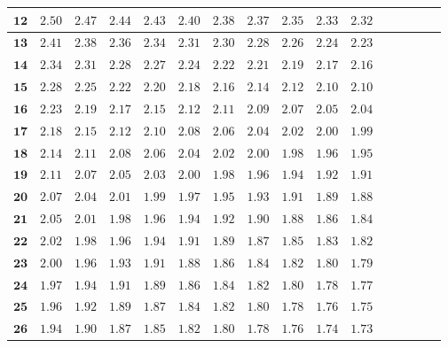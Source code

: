 \begin{alternateColorTable}
\begin{longtable}{|r|r|r|r|r|r|r|r|r|r|r|r|r|r|r|r|}
    \(\mathbf{12}\)& \(2.50\) & \(2.47\) & \(2.44\) & \(2.43\) & \(2.40\) & \(2.38\) & \(2.37\) & \(2.35\) & \(2.33\) & \(2.32\) \\ \hline 
    \(\mathbf{13}\)& \(2.41\) & \(2.38\) & \(2.36\) & \(2.34\) & \(2.31\) & \(2.30\) & \(2.28\) & \(2.26\) & \(2.24\) & \(2.23\) \\ \hline 
    \(\mathbf{14}\)& \(2.34\) & \(2.31\) & \(2.28\) & \(2.27\) & \(2.24\) & \(2.22\) & \(2.21\) & \(2.19\) & \(2.17\) & \(2.16\) \\ \hline 
    \(\mathbf{15}\)& \(2.28\) & \(2.25\) & \(2.22\) & \(2.20\) & \(2.18\) & \(2.16\) & \(2.14\) & \(2.12\) & \(2.10\) & \(2.10\) \\ \hline 
    \(\mathbf{16}\)& \(2.23\) & \(2.19\) & \(2.17\) & \(2.15\) & \(2.12\) & \(2.11\) & \(2.09\) & \(2.07\) & \(2.05\) & \(2.04\) \\ \hline 
    \(\mathbf{17}\)& \(2.18\) & \(2.15\) & \(2.12\) & \(2.10\) & \(2.08\) & \(2.06\) & \(2.04\) & \(2.02\) & \(2.00\) & \(1.99\) \\ \hline 
    \(\mathbf{18}\)& \(2.14\) & \(2.11\) & \(2.08\) & \(2.06\) & \(2.04\) & \(2.02\) & \(2.00\) & \(1.98\) & \(1.96\) & \(1.95\) \\ \hline 
    \(\mathbf{19}\)& \(2.11\) & \(2.07\) & \(2.05\) & \(2.03\) & \(2.00\) & \(1.98\) & \(1.96\) & \(1.94\) & \(1.92\) & \(1.91\) \\ \hline 
    \(\mathbf{20}\)& \(2.07\) & \(2.04\) & \(2.01\) & \(1.99\) & \(1.97\) & \(1.95\) & \(1.93\) & \(1.91\) & \(1.89\) & \(1.88\) \\ \hline 
    \(\mathbf{21}\)& \(2.05\) & \(2.01\) & \(1.98\) & \(1.96\) & \(1.94\) & \(1.92\) & \(1.90\) & \(1.88\) & \(1.86\) & \(1.84\) \\ \hline 
    \(\mathbf{22}\)& \(2.02\) & \(1.98\) & \(1.96\) & \(1.94\) & \(1.91\) & \(1.89\) & \(1.87\) & \(1.85\) & \(1.83\) & \(1.82\) \\ \hline 
    \(\mathbf{23}\)& \(2.00\) & \(1.96\) & \(1.93\) & \(1.91\) & \(1.88\) & \(1.86\) & \(1.84\) & \(1.82\) & \(1.80\) & \(1.79\) \\ \hline 
    \(\mathbf{24}\)& \(1.97\) & \(1.94\) & \(1.91\) & \(1.89\) & \(1.86\) & \(1.84\) & \(1.82\) & \(1.80\) & \(1.78\) & \(1.77\) \\ \hline 
    \(\mathbf{25}\)& \(1.96\) & \(1.92\) & \(1.89\) & \(1.87\) & \(1.84\) & \(1.82\) & \(1.80\) & \(1.78\) & \(1.76\) & \(1.75\) \\ \hline 
    \(\mathbf{26}\)& \(1.94\) & \(1.90\) & \(1.87\) & \(1.85\) & \(1.82\) & \(1.80\) & \(1.78\) & \(1.76\) & \(1.74\) & \(1.73\) \\ \hline 

\end{longtable}
\end{alternateColorTable}
